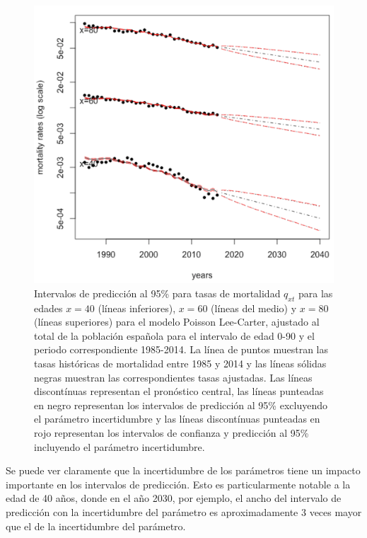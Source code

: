 \vspace{-0.3cm}
\begin{figure}[!htp]
\centering
\includegraphics[scale=0.45]{Cap2/stmomo02.png}
\captionsetup{width=1\linewidth}
\caption[Intervalos de predicci\'on para las tasas de mortalidad]{Intervalos de predicci\'on al 95\% para tasas de mortalidad $q_{xt}$ para las edades $x=40$ (l\'ineas inferiores), $x=60$ (l\'ineas del medio) y $x=80$ (l\'ineas superiores) para el modelo Poisson Lee-Carter, ajustado al total de la poblaci\'on espa\~nola para el intervalo de edad 0-90 y el periodo correspondiente 1985-2014. La l\'inea de puntos muestran las tasas hist\'oricas de mortalidad entre 1985 y 2014 y las l\'ineas s\'olidas negras muestran las correspondientes tasas ajustadas. Las l\'ineas discont\'inuas representan el pron\'ostico central, las l\'ineas punteadas en negro representan los intervalos de predicci\'on al 95\% excluyendo el par\'ametro incertidumbre y las l\'ineas discont\'inuas punteadas en rojo representan los intervalos de confianza y predicci\'on al 95\% incluyendo el par\'ametro incertidumbre.}
\end{figure}

Se puede ver claramente que la incertidumbre de los parámetros tiene un impacto importante en los intervalos de predicción. Esto es particularmente notable a la edad de 40 años, donde en el año 2030, por ejemplo, el ancho del intervalo de predicción con la incertidumbre del parámetro es aproximadamente 3 veces mayor que el de la incertidumbre del parámetro.


